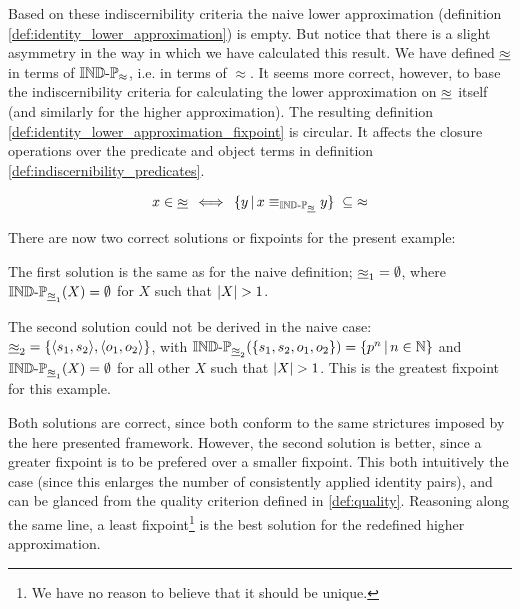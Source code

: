 Based on these indiscernibility criteria the naive lower approximation
  (definition \ref{def:identity_lower_approximation}) is empty.
But notice that there is a slight asymmetry in the way in which we have
  calculated this result.
We have defined $\underline{\approx}$ in terms of $\operatorname{{\mathbb{IND}-\mathbb{P}}}_{\approx}$,
  i.e. in terms of $\approx$.
It seems more correct, however, to base the indiscernibility criteria
  for calculating the lower approximation on $\underline{\approx}$ itself
  (and similarly for the higher approximation).
The resulting definition \ref{def:identity_lower_approximation_fixpoint}
  is circular.
It affects the closure operations over the predicate and object terms
  in definition \ref{def:indiscernibility_predicates}.

\begin{definition}
\label{def:identity_lower_approximation_fixpoint}
\begin{align}
  x \in \underline{\approx}
\, \iff \,
    \{y\,\vert\,x \equiv_{\operatorname{{\mathbb{IND}-\mathbb{P}}}_{\underline{\approx}}} y\}
  \; \subseteq \;
    \approx\nonumber
\end{align}
\end{definition}

There are now two correct solutions or fixpoints for the present example:

The first solution is the same as for the naive definition;
  $\underline{\approx}_1 = \emptyset$,
  where $\operatorname{{\mathbb{IND}-\mathbb{P}}}_{\underline{\approx}_1}(X) = \emptyset$
  for $X$ such that $\lvert X\rvert > 1$.

The second solution could not be derived in the naive case:
  $\underline{\approx}_2 = \{\langle s_1,s_2\rangle,\langle o_1,o_2\rangle\}$,
  with $\operatorname{{\mathbb{IND}-\mathbb{P}}}_{\underline{\approx}_2}(\{s_1,s_2,o_1,o_2\}) = \{p^n\,\vert\,n \in \mathbb{N}\}$
  and $\operatorname{{\mathbb{IND}-\mathbb{P}}}_{\underline{\approx}_1}(X) = \emptyset$
  for all other $X$ such that $\lvert X\rvert > 1$.
This is the greatest fixpoint for this example.

Both solutions are correct,
  since both conform to the same strictures imposed by the here presented
  framework.
However, the second solution is better, since a greater fixpoint is
  to be prefered over a smaller fixpoint.
This both intuitively the case
  (since this enlarges the number of consistently applied identity pairs),
  and can be glanced from the quality criterion defined in \ref{def:quality}.
Reasoning along the same line,
  a least fixpoint\footnote{
    We have no reason to believe that it should be unique.
  } is the best solution for the redefined higher approximation.
